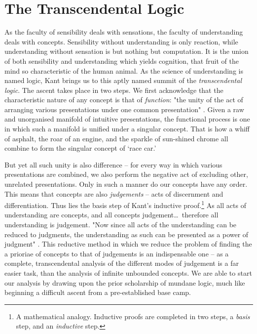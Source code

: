 \section*{The Transcendental Logic}
As the faculty of sensibility deals with sensations, the faculty of understanding deals with concepts. Sensibility without understanding is only reaction, while understanding without sensation is but nothing but computation. It is the union of both sensibility and understanding which yields cognition, that fruit of the mind so characteristic of the human animal. As the science of understanding is named logic, Kant brings us to this aptly named summit of the \emph{transcendental logic}. The ascent takes place in two steps. We first acknowledge that the characteristic nature of any concept is that of \emph{function}: "the unity of the act of arranging various presentations under one common presentation" \autocite[B93]{hackett}. Given a raw and unorganised manifold of intuitive presentations, the functional process is one in which such a manifold is unified under a singular concept. That is how a whiff of asphalt, the roar of an engine, and the sparkle of sun-shined chrome all combine to form the singular concept of `race car.'

But yet all such unity is also difference -- for every way in which various presentations are combined, we also perform the negative act of excluding other, unrelated presentations. Only in such a manner do our concepts have any order. This means that concepts are also \emph{judgements} -- acts of discernment and differentiation. Thus lies the basis step of Kant's inductive proof.\footnote{A mathematical analogy. Inductive proofs are completed in two steps, a \emph{basis} step, and an \emph{inductive} step.} As all acts of understanding are concepts, and all concepts judgement\ldots\ therefore all understanding is judgement. "Now since all acts of the understanding can be reduced to judgments, the understanding as such can be presented as a power of judgment" \autocite[B94]{hackett}. This reductive method in which we reduce the problem of finding the a prioriae of concepts to that of judgements is an indispensable one -- as a complete, transcendental analysis of the different modes of judgement is a far easier task, than the analysis of infinite unbounded concepts. We are able to start our analysis by drawing upon the prior scholarship of mundane logic, much like beginning a difficult ascent from a pre-established base camp.



